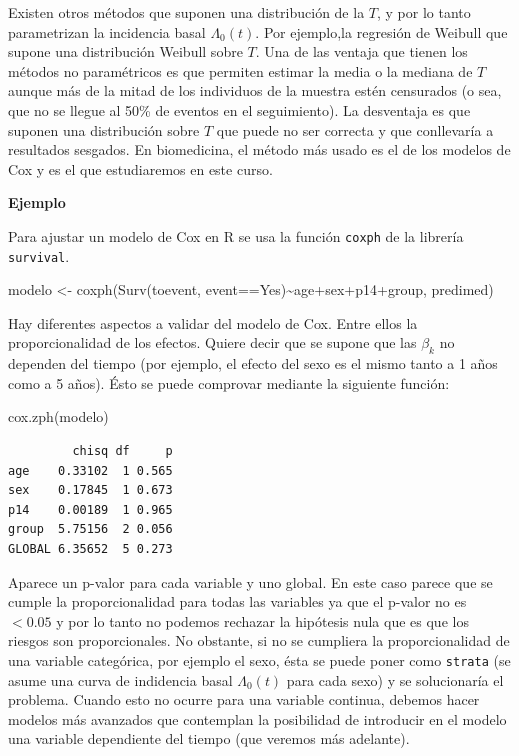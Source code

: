 \documentclass[
]{book}
\newenvironment{Shaded}{\begin{snugshade}}{\end{snugshade}}
\newcommand{\FunctionTok}[1]{\textcolor[rgb]{0.00,0.00,0.00}{#1}}
\newcommand{\NormalTok}[1]{#1}
\newcommand{\OtherTok}[1]{\textcolor[rgb]{0.56,0.35,0.01}{#1}}
\newcommand{\SpecialCharTok}[1]{\textcolor[rgb]{0.00,0.00,0.00}{#1}}
\newcommand{\StringTok}[1]{\textcolor[rgb]{0.31,0.60,0.02}{#1}}
\begin{document}
Existen otros métodos que suponen una distribución de la \(T\), y por lo tanto parametrizan la incidencia basal \(\Lambda_0(t)\). Por ejemplo,la regresión de Weibull que supone una distribución Weibull sobre \(T\). Una de las ventaja que tienen los métodos no paramétricos es que permiten estimar la media o la mediana de \(T\) aunque más de la mitad de los individuos de la muestra estén censurados (o sea, que no se llegue al 50\% de eventos en el seguimiento). La desventaja es que suponen una distribución sobre \(T\) que puede no ser correcta y que conllevaría a resultados sesgados. En biomedicina, el método más usado es el de los modelos de Cox y es el que estudiaremos en este curso.

\textbf{Ejemplo}

Para ajustar un modelo de Cox en R se usa la función \texttt{coxph} de la librería \texttt{survival}.

\begin{Shaded}
\begin{Highlighting}[]
\NormalTok{modelo }\OtherTok{\textless{}{-}} \FunctionTok{coxph}\NormalTok{(}\FunctionTok{Surv}\NormalTok{(toevent, event}\SpecialCharTok{==}\StringTok{\textquotesingle{}Yes\textquotesingle{}}\NormalTok{)}\SpecialCharTok{\textasciitilde{}}\NormalTok{age}\SpecialCharTok{+}\NormalTok{sex}\SpecialCharTok{+}\NormalTok{p14}\SpecialCharTok{+}\NormalTok{group, predimed)}
\end{Highlighting}
\end{Shaded}

Hay diferentes aspectos a validar del modelo de Cox. Entre ellos la proporcionalidad de los efectos. Quiere decir que se supone que las \(\beta_k\) no dependen del tiempo (por ejemplo, el efecto del sexo es el mismo tanto a 1 años como a 5 años). Ésto se puede comprovar mediante la siguiente función:

\begin{Shaded}
\begin{Highlighting}[]
\FunctionTok{cox.zph}\NormalTok{(modelo)}
\end{Highlighting}
\end{Shaded}

\begin{verbatim}
         chisq df     p
age    0.33102  1 0.565
sex    0.17845  1 0.673
p14    0.00189  1 0.965
group  5.75156  2 0.056
GLOBAL 6.35652  5 0.273
\end{verbatim}

Aparece un p-valor para cada variable y uno global. En este caso parece que se cumple la proporcionalidad para todas las variables ya que el p-valor no es \(<0.05\) y por lo tanto no podemos rechazar la hipótesis nula que es que los riesgos son proporcionales. No obstante, si no se cumpliera la proporcionalidad de una variable categórica, por ejemplo el sexo, ésta se puede poner como \texttt{strata} (se asume una curva de indidencia basal \(\Lambda_0(t)\) para cada sexo) y se solucionaría el problema. Cuando esto no ocurre para una variable continua, debemos hacer modelos más avanzados que contemplan la posibilidad de introducir en el modelo una variable dependiente del tiempo (que veremos más adelante).
\end{document}
